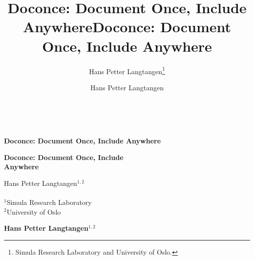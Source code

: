 \documentclass[twoside]{book}
\begin{document}





\title{Doconce: Document Once, Include Anywhere}


\thispagestyle{empty}
\hbox{\ \ }
\vfill
\begin{center}
{\huge{\bfseries{Doconce: Document Once, Include Anywhere}}}


\title*{Doconce: Document Once, Include Anywhere}


\begin{center}
{\LARGE\bf Doconce: Document Once, Include \\ [1.5mm] Anywhere}
\end{center}




\author{Hans Petter Langtangen\footnote{Simula Research Laboratory and University of Oslo.}}

\vspace{1.3cm}

    {\Large\textsf{Hans Petter Langtangen${}^{1, 2}$}}\\ [3mm]
    
\ \\ [2mm]

{\large\textsf{${}^1$Simula Research Laboratory} \\ [1.5mm]}
{\large\textsf{${}^2$University of Oslo} \\ [1.5mm]}

\author{Hans Petter Langtangen}


\begin{center}
{\bf Hans Petter Langtangen${}^{1, 2}$} \\ [0mm]
\end{center}


\end{center}
\end{document}
